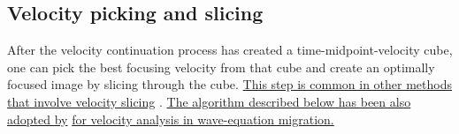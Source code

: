 
\subsection{Velocity picking and slicing}

After the velocity continuation process has created a time-midpoint-velocity
cube, one can pick the best focusing velocity from that cube and create an
optimally focused image by slicing through the cube. \uline{This step is common in
other methods that involve velocity slicing}
\cite{shurtleff,SEG-1984-S1.8,GEO57-01-00510059}. \uline{The algorithm described
below has been also adopted by}  \uline{for velocity
analysis in wave-equation migration.}

